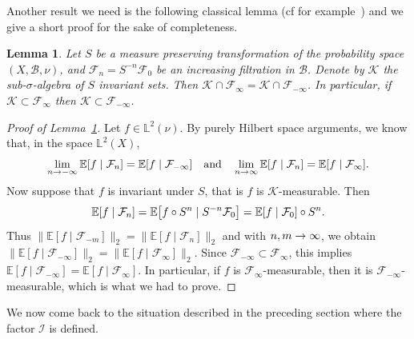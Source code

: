 \documentclass[10pt]{amsart}
\newtheorem{lemm}[theo]{Lemma}\newtheorem{prop}[theo]{Proposition}\newtheorem{coro}[theo]{Corollary}\newtheorem{conj}[theo]{Conjecture}
\theoremstyle{definition}\newtheorem{defi}[theo]{Definition}\newtheorem{rema}[theo]{Remark}\newtheorem{exam}[theo]{Example}\newtheorem{exem}[theo]{Example}\newtheorem{nota}[theo]{Notation}
\newcommand*\bbL{\mathbb{L}}
\newcommand{\bbE}{\mathbb{E}}
\newcommand{\E}[1]{\bbE\left[#1\right]}
\newcommand*\I{\mathcal{I}}
\newcommand*\B{\mathcal{B}}
\newcommand*\F{\mathcal{F}}
\newcommand*\K{\mathcal{K}}
\renewcommand*{\to}{\mathchoice{\longrightarrow}{\rightarrow}{\rightarrow}{\rightarrow}}
\let\originalleft\left
\let\originalright\right
\renewcommand{\left}{\mathopen{}\mathclose\bgroup\originalleft}
\renewcommand{\right}{\aftergroup\egroup\originalright}
\begin{document}
Another result we need is the following classical lemma (cf for example~\cite{MR262464}) and we give a short proof for the sake of completeness.
\begin{lemm} \label{class}
Let $S$ be a measure preserving transformation of the probability space $(X,\B,\nu)$, and $\F_n = S^{-n}\F_0$ be an increasing filtration in $\B$. Denote by $\K$ the sub-$\sigma$-algebra of $S$ invariant sets. Then $\K \cap \F_{\infty}=\K \cap \F_{-\infty}$.
In particular, if $\K \subset \F_{\infty}$ then $\K \subset \F_{-\infty}$.
\end{lemm}
\begin{proof}[Proof of Lemma~\ref{class}]
Let $f\in \bbL^2(\nu)$. By purely Hilbert space arguments, we know that, in the space $ \bbL^2(X)$,
\[
\lim_{n\to-\infty}\E{f\mid\F_n}=\E{f\mid\F_{-\infty}}
\quad\text{and}\quad \lim_{n\to\infty}\E{f\mid\F_n}=\E{f\mid\F_{\infty}}.
\]
Now suppose that $f$ is invariant under $S$, that is $f$ is $\K$-measurable. Then
\[
\E{f\mid\F_n}=\E{f\circ S^n\mid S^{-n}\F_0}=\E{f\mid\F_0 }\circ S^n.
\]
Thus $\|\bbE[f\mid\F_{-m}]\|_2=\|\bbE[f\mid\F_n]\|_2$ and with $n,m\to\infty$, we obtain $\|\bbE[f\mid\F_{-\infty}]\|_2=\|\bbE[f\mid\F_\infty]\|_2$. Since $\F_{-\infty}\subset\F_\infty$, this implies $
\bbE[f\mid\F_{-\infty}]=\bbE[f\mid\F_{\infty}] $. In particular, if $f$ is $\F_{\infty}$-measurable, then it is $\F_{-\infty}$-measurable, which is what we had to prove.
\end{proof}

We now come back to the situation described in the preceding section where the factor $\I$ is defined.
\end{document}
